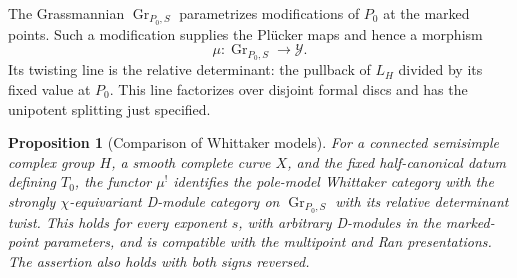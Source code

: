 \documentclass[11pt]{article}
\numberwithin{equation}{section}
\newtheorem{proposition}[theorem]{Proposition}
\theoremstyle{definition}
\theoremstyle{remark}
\begin{document}
The Grassmannian $\operatorname{Gr}_{P_0,S}$ parametrizes modifications of
$P_0$ at the marked points. Such a modification supplies the Pl\"ucker
maps and hence a morphism
\[
 \mu:\operatorname{Gr}_{P_0,S}\longrightarrow\mathcal Y.
\]
Its twisting line is the relative determinant: the pullback of $L_H$
divided by its fixed value at $P_0$. This line factorizes over disjoint
formal discs and has the unipotent splitting just specified.

\begin{proposition}[Comparison of Whittaker models]
\label{whittaker:model-comparison}
For a connected semisimple complex group $H$, a smooth complete curve $X$,
and the fixed half-canonical datum defining $T_0$, the functor $\mu^!$
identifies the pole-model Whittaker category with the strongly
$\chi$-equivariant D-module category on
$\operatorname{Gr}_{P_0,S}$ with its relative determinant twist. This holds
for every exponent $s$, with arbitrary D-modules in the marked-point
parameters, and is compatible with the multipoint and Ran presentations.
The assertion also holds with both signs reversed.
\end{proposition}
\end{document}
